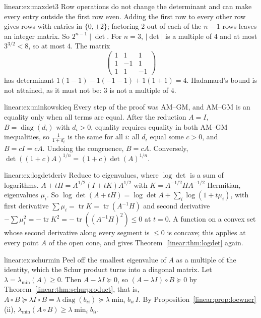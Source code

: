 \begin{solution}{linear:ex:maxdet3}
\idea Row operations do not change the determinant and can make every entry outside the first row even.
\writeup Adding the first row to every other row gives rows with entries in $\{0,\pm2\}$; factoring $2$ out of each of the $n-1$ rows
leaves an integer matrix. So $2^{n-1}\mid\det$. For $n=3$, $|\det|$ is a multiple of $4$ and at most $3^{3/2}<8$, so at most $4$. The matrix
\[
\begin{pmatrix}1&1&1\\1&-1&1\\1&1&-1\end{pmatrix}
\]
has determinant $1(1-1)-1(-1-1)+1(1+1)=4$. Hadamard's bound is not attained, as it must not be: $3$ is not a multiple of $4$.
\end{solution}

\begin{solution}{linear:ex:minkowskieq}
\idea Every step of the proof was AM--GM, and AM--GM is an equality only when all terms are equal.
\writeup After the reduction $A=I$, $B=\operatorname{diag}(d_i)$ with $d_i>0$, equality requires equality in both AM--GM inequalities,
so $\frac{1}{1+d_i}$ is the same for all $i$: all $d_i$ equal some $c>0$, and $B=cI=cA$. Undoing the congruence, $B=cA$. Conversely,
$\det((1+c)A)^{1/n}=(1+c)\det(A)^{1/n}$.
\end{solution}

\begin{solution}{linear:ex:logdetderiv}
\idea Reduce to eigenvalues, where $\log\det$ is a sum of logarithms.
\writeup $A+tH=A^{1/2}(I+tK)A^{1/2}$ with $K=A^{-1/2}HA^{-1/2}$ Hermitian, eigenvalues $\mu_i$. So $\log\det(A+tH)=\log\det A+\sum_i\log(1+
t\mu_i)$, with first derivative $\sum\mu_i=\operatorname{tr}K=\operatorname{tr}(A^{-1}H)$ and second derivative $-\sum\mu_i^2=-\operatorname{tr}
K^2=-\operatorname{tr}((A^{-1}H)^2)\le0$ at $t=0$. A function on a convex set whose second derivative along every segment is $\le0$ is
concave; this applies at every point $A$ of the open cone, and gives Theorem~\ref{linear:thm:logdet} again.
\end{solution}

\begin{solution}{linear:ex:schurmin}
\idea Peel off the smallest eigenvalue of $A$ as a multiple of the identity, which the Schur product turns into a diagonal matrix.
\writeup Let $\lambda=\lambda_{\min}(A)\ge0$. Then $A-\lambda I\succeq0$, so $(A-\lambda I)\circ B\succeq0$ by Theorem~\ref{linear:thm:schurproduct},
that is, $A\circ B\succeq\lambda I\circ B=\lambda\operatorname{diag}(b_{ii})\succeq\lambda\min_ib_{ii}\,I$. By Proposition~\ref{linear:prop:loewner}(ii),
$\lambda_{\min}(A\circ B)\ge\lambda\min_ib_{ii}$.
\end{solution}

